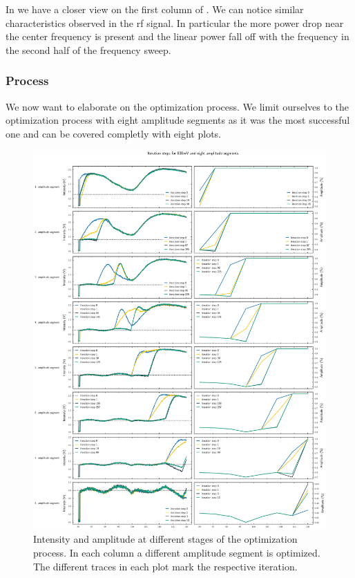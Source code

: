 In  we have a closer
view on the first column of . We
can notice similar characteristics observed in the \gls{rf} signal. In
particular the more power drop near the center frequency is present and the
linear power fall off with the frequency in the second half of the frequency
sweep.

\subsubsection{Process}

We now want to elaborate on the optimization process. We limit ourselves to
the optimization process with eight amplitude segments as it was the most
successful one and can be covered completly with eight plots.

\begin{figure}[htb]
  \centering
  \includegraphics[width=\textwidth]{../figure/intensity/optimization/process.pdf}
  \caption{Intensity and amplitude at different stages of the optimization
  process. In each column a different amplitude segment is optimized.
  The different traces in each plot mark the respective iteration.}
  \label{fig:intensity_optimization_process}
\end{figure}

